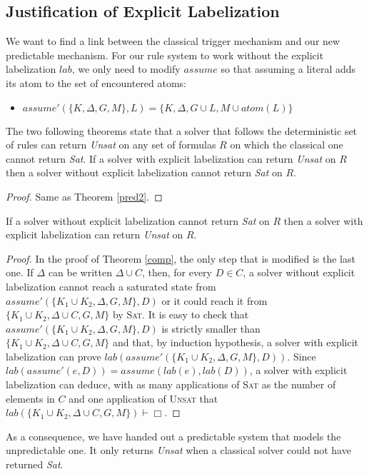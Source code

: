 \documentclass[a4paper,11pt]{article}
\newcommand{\atom}{\mathit{atom}}
\newcommand{\T}{\mathit{lab}}
\newcommand{\A}{\mathit{assume}}
\begin{document}
\subsection{Justification of Explicit Labelization}
We want to find a link between the classical trigger mechanism and our new predictable mechanism.
For our rule system to work without the explicit labelization $\T$, we only need to modify $\A$ so that
assuming a literal adds its atom to the set of encountered atoms:
\begin{itemize}
 \item $\A'(\{K,\Delta,G,M\},L)=\{K,\Delta,G\cup L,M\cup\atom(L)\}$
\end{itemize}

The two following theorems state that a solver that follows the deterministic set of rules can return
\emph{Unsat} on any set of formulas $R$ on which the classical one cannot return \emph{Sat}.
{\theorem If a solver with explicit labelization can return \emph{Unsat} on $R$ then
a solver without explicit labelization cannot return \emph{Sat} on $R$.}
\begin{proof}
Same as Theorem \ref{pred2}.
\end{proof}

{\theorem If a solver without explicit labelization cannot return \emph{Sat} on $R$ then
a solver with explicit labelization can return \emph{Unsat} on $R$.}
\begin{proof}
In the proof of Theorem \ref{comp}, the only step that is modified is the last one.
If $\Delta$ can be written $\Delta\cup C$, then, for every $D\in C$, a solver without explicit labelization
cannot reach a saturated state from $\A'(\{K_1\cup K_2,\Delta,G,M\},D)$ or it could
reach it from $\{K_1\cup K_2,\Delta\cup C,G,M\}$ by \textsc{Sat}.
It is easy to check that 
$\A'(\{K_1\cup K_2,\Delta,G,M\},D)$ is strictly smaller than $\{K_1\cup K_2,\Delta\cup C,G,M\}$
and that, by induction hypothesis, a solver with explicit labelization can prove
$\T(\A'(\{K_1\cup K_2,\Delta,G,M\},D))$. Since
$\T(\A'(e,D))=\A(\T(e),\T(D))$,
a solver with explicit labelization can deduce, with as many applications of \textsc{Sat} as the number
of elements in $C$ and one application of \textsc{Unsat} that
$\T(\{K_1\cup K_2,\Delta\cup C,G,M\})\vdash\Box$.
\end{proof}

As a consequence, we have handed out a predictable system that models the unpredictable one. It only
returns \emph{Unsat} when a classical solver could not have returned \emph{Sat}.
\end{document}
